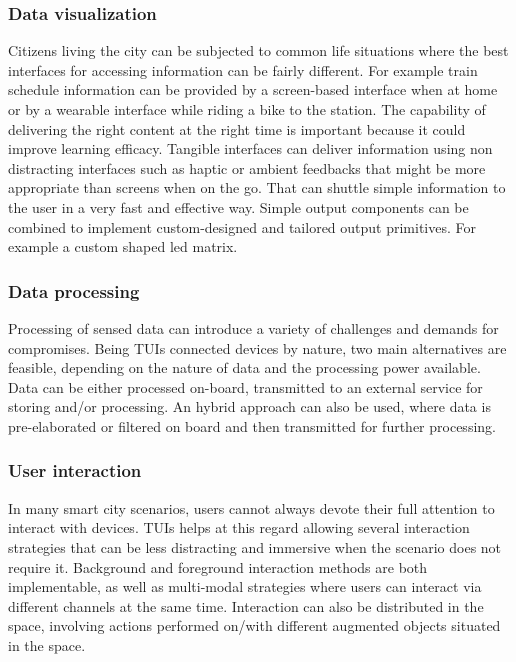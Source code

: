 \subsubsection{Data visualization}
Citizens living the city can be subjected to common life situations where the best interfaces for accessing information can be fairly different. For example train schedule information can be provided by a screen-based interface when at home or by a wearable interface while riding a bike to the station. The capability of delivering the right content at the right time is important because it could improve learning efficacy. Tangible interfaces can deliver information using non distracting interfaces such as haptic or ambient feedbacks that might be more appropriate than screens when on the go. That can shuttle simple information to the user in a very fast and effective way.
Simple output components can be combined to implement custom-designed and tailored output primitives. For example a custom shaped led matrix.

\subsubsection{Data processing} %
Processing of sensed data can introduce a variety of challenges and demands for compromises. Being TUIs connected devices by nature, two main alternatives are feasible, depending on the nature of data and the processing power available. Data can be either processed on-board, transmitted to an external service for storing and/or processing. An hybrid approach can also be used, where data is pre-elaborated or filtered on board and then transmitted for further processing.

\subsubsection{User interaction} %
In many smart city scenarios, users cannot always devote their full attention to interact with devices. TUIs helps at this regard allowing several interaction strategies that can be less distracting and immersive when the scenario does not require it.
Background and foreground interaction methods are both implementable, as well as multi-modal strategies where users can interact via different channels at the same time. Interaction can also be distributed in the space, involving actions performed on/with different augmented objects situated in the space.

